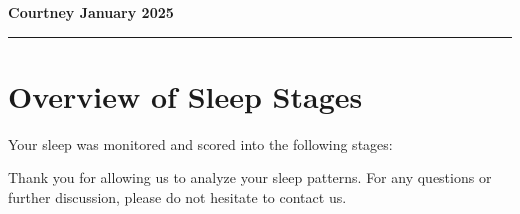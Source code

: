\documentclass{article}
\begin{document}
\noindent\Huge\textbf{Courtney January 2025}
\vspace{10pt}
\hrule
  
\small
\section*{Overview of Sleep Stages}
Your sleep was monitored and scored into the following stages:

Thank you for allowing us to analyze your sleep patterns. For any questions or further discussion, please do not hesitate to contact us.
\end{document}
